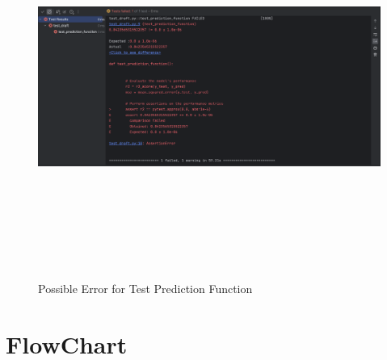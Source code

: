 \begin{enumerate}
\begin{itemize}
\begin{itemize}
				\end{itemize}
				
			\end{itemize}
			
			\begin{center}
				\begin{figure}[h!]
					\begin{center}
						\includegraphics[height=125mm, width=130mm]{Images/TestPred}
					\end{center}
					\caption{ Possible Error for Test Prediction Function }
				\end{figure}
			\end{center}
		
		\end{enumerate}
	
	
	\section{FlowChart}
	
